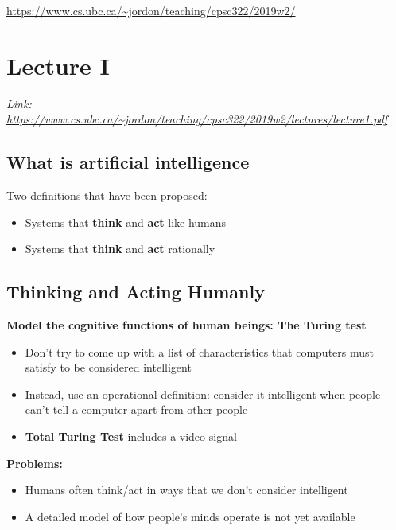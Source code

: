 \documentclass{article}
\begin{document}
\noindent \url{https://www.cs.ubc.ca/~jordon/teaching/cpsc322/2019w2/}
\section*{Lecture I}
{\it Link: \url{https://www.cs.ubc.ca/~jordon/teaching/cpsc322/2019w2/lectures/lecture1.pdf}}

\subsection*{What is artificial intelligence}
Two definitions that have been proposed:
\begin{itemize}
	\item Systems that {\bf think} and {\bf act} like humans
	\item Systems that {\bf think} and {\bf act} rationally 
\end{itemize}

\subsection*{Thinking and Acting Humanly}
{\bf Model the cognitive functions of human beings: The Turing test}
\begin{itemize}
	\item Don't try to come up with a list of characteristics that computers must satisfy to be considered intelligent
	\item Instead, use an operational definition: consider it intelligent when people can't tell a computer apart from other people
	\item {\bf Total Turing Test} includes a video signal
\end{itemize}
{\bf Problems:}
\begin{itemize}
	\item Humans often think/act in ways that we don't consider intelligent
	\item A detailed model of how people's minds operate is not yet available
\end{itemize}
\end{document}

